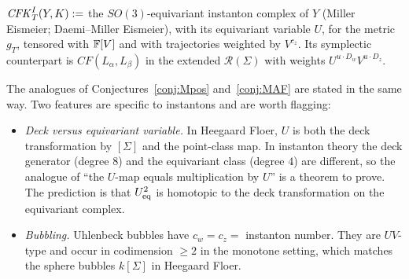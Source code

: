 \begin{definition}
$\mathit{CFK}^{I}_T(Y,K):=$ the $SO(3)$-equivariant instanton complex of $Y$ (Miller Eismeier; Daemi--Miller Eismeier), with its
equivariant variable $U$, for the metric $g_T$, tensored with $\mathbb{F}[V]$ and with trajectories weighted by $V^{c_z}$.  Its
symplectic counterpart is $CF(L_\alpha,L_\beta)$ in the extended $\mathcal R(\Sigma)$ with weights $U^{u\cdot D_w}V^{u\cdot D_z}$.
\end{definition}
The analogues of Conjectures~\ref{conj:Mpos} and~\ref{conj:MAF} are stated in the same way.  Two features are specific
to instantons and are worth flagging:
\begin{itemize}[leftmargin=2em]
\item \emph{Deck versus equivariant variable.}  In Heegaard Floer, $U$ is both the deck transformation by $[\Sigma]$ and the
point-class map.  In instanton theory the deck generator (degree $8$) and the equivariant class (degree $4$) are
different, so the analogue of ``the $U$-map equals multiplication by $U$'' is a theorem to prove.  The prediction is that
$U_{\rm eq}^2$ is homotopic to the deck transformation on the equivariant complex.
\item \emph{Bubbling.}  Uhlenbeck bubbles have $c_w=c_z=$ instanton number.  They are $UV$-type and occur in codimension
$\ge2$ in the monotone setting, which matches the sphere bubbles $k[\Sigma]$ in Heegaard Floer.
\end{itemize}
